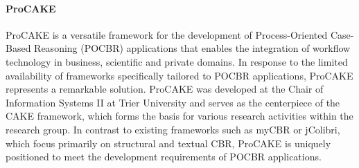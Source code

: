        
            \paragraph{ProCAKE}
            ProCAKE is a versatile framework for the development of Process-Oriented Case-Based Reasoning (POCBR) applications that enables the integration of workflow technology in business, scientific and private domains. In response to the limited availability of frameworks specifically tailored to POCBR applications, ProCAKE represents a remarkable solution. ProCAKE was developed at the Chair of Information Systems II at Trier University and serves as the centerpiece of the CAKE framework, which forms the basis for various research activities within the research group. In contrast to existing frameworks such as myCBR or jColibri, which focus primarily on structural and textual CBR, ProCAKE is uniquely positioned to meet the development requirements of POCBR applications.


